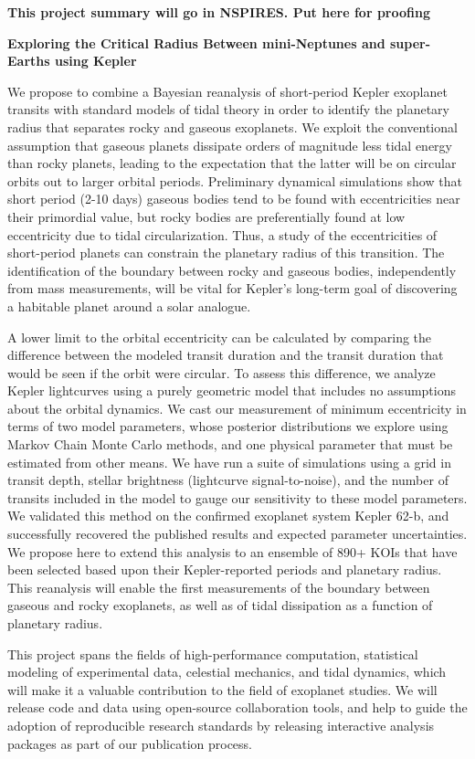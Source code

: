 \centerline{\bf This project summary will go in NSPIRES.  Put here for proofing} \medskip

\centerline{\bf Exploring the Critical Radius Between mini-Neptunes and super-Earths using Kepler} \medskip

We propose to combine a Bayesian reanalysis of short-period Kepler exoplanet transits with standard models of tidal theory in order to identify the planetary radius that separates rocky and gaseous exoplanets. We exploit the conventional assumption that gaseous planets dissipate orders of magnitude less tidal energy than rocky planets, leading to the expectation that the latter will be on circular orbits out to larger orbital periods. Preliminary dynamical simulations show that short period (2-10 days) gaseous bodies tend to be found with eccentricities near their primordial value, but rocky bodies are preferentially found at low eccentricity due to tidal circularization.  Thus, a study of the eccentricities of short-period planets can constrain the planetary radius of this transition.  The identification of the boundary between rocky and gaseous bodies, independently from mass measurements, will be vital for Kepler's long-term goal of discovering a habitable planet around a solar analogue.

A lower limit to the orbital eccentricity can be calculated by comparing the difference between the modeled transit duration and the transit duration that would be seen if the orbit were circular.  To assess this difference, we analyze Kepler lightcurves using a purely geometric model that includes no assumptions about the orbital dynamics.  We cast our measurement of minimum eccentricity in terms of two model parameters, whose posterior distributions we explore using Markov Chain Monte Carlo methods, and one physical parameter that must be estimated from other means.  We have run a suite of simulations using a grid in transit depth, stellar brightness (lightcurve signal-to-noise), and the number of transits included in the model to gauge our sensitivity to these model parameters.  We validated this method on the confirmed exoplanet system Kepler 62-b, and successfully recovered the published results and expected parameter uncertainties. We propose here to extend this analysis to an ensemble of 890+ KOIs that have been selected based upon their Kepler-reported periods and planetary radius.  This reanalysis will enable the first measurements of the boundary between gaseous and rocky exoplanets, as well as of tidal dissipation as a function of planetary radius.

This project spans the fields of high-performance computation, statistical modeling of experimental data, celestial mechanics, and tidal dynamics, which will make it a valuable contribution to the field of exoplanet studies.  We will release code and data using open-source collaboration tools, and help to guide the adoption of reproducible research standards by releasing interactive analysis packages as part of our publication process.

